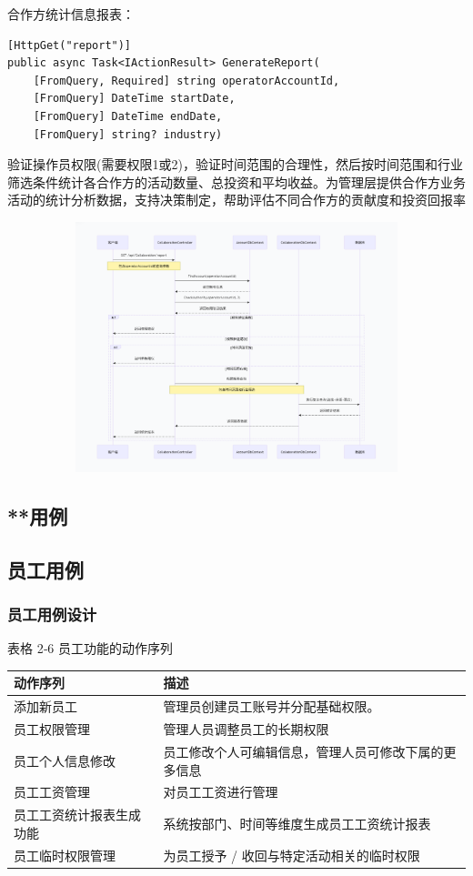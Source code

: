 \documentclass[]{article}
\begin{document}
合作方统计信息报表：

\begin{verbatim}
[HttpGet("report")]
public async Task<IActionResult> GenerateReport(
    [FromQuery, Required] string operatorAccountId,
    [FromQuery] DateTime startDate,
    [FromQuery] DateTime endDate,
    [FromQuery] string? industry)
\end{verbatim}

验证操作员权限(需要权限1或2)，验证时间范围的合理性，然后按时间范围和行业筛选条件统计各合作方的活动数量、总投资和平均收益。为管理层提供合作方业务活动的统计分析数据，支持决策制定，帮助评估不同合作方的贡献度和投资回报率

\includegraphics[width=5.64167in,height=2.86458in]{media/media/image_2-4-8.png}

\hypertarget{ux7528ux4f8b-3}{%
  \subsection{**用例}\label{ux7528ux4f8b-3}}

\hypertarget{ux5458ux5de5ux7528ux4f8b}{%
  \subsection{员工用例}\label{ux5458ux5de5ux7528ux4f8b}}

\hypertarget{ux5458ux5de5ux7528ux4f8bux8bbeux8ba1}{%
  \subsubsection{员工用例设计}\label{ux5458ux5de5ux7528ux4f8bux8bbeux8ba1}}

表格 2‑6 员工功能的动作序列

\begin{longtable}[]{@{}ll@{}}
  \toprule
  动作序列         & 描述\tabularnewline
  \midrule
  \endhead
  添加新员工        & 管理员创建员工账号并分配基础权限。\tabularnewline
  员工权限管理       & 管理人员调整员工的长期权限\tabularnewline
  员工个人信息修改     &
  员工修改个人可编辑信息，管理人员可修改下属的更多信息\tabularnewline
  员工工资管理       & 对员工工资进行管理\tabularnewline
  员工工资统计报表生成功能 &
  系统按部门、时间等维度生成员工工资统计报表\tabularnewline
  员工临时权限管理     & 为员工授予 /
  收回与特定活动相关的临时权限\tabularnewline
  \bottomrule
\end{longtable}
\end{document}
